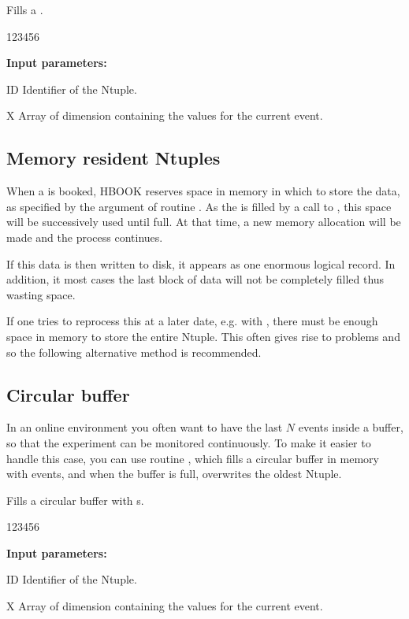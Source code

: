  
\Action
Fills a \RWN{}.
 
\begin{DLtt}{123456}
\item[{\rm\bf Input parameters:}]
\item[ID] Identifier of the Ntuple.
\item[X] Array of dimension  containing
the values for the current event.
\end{DLtt}
 
\subsection*{Memory resident Ntuples} 

When a \RWN{} is booked, HBOOK reserves space in memory
in which to store the data, as specified by the 
argument of routine .
As the \RWN{} is filled by a call to , 
this space will be successively used until full. 
At that time, a new memory allocation will be made
and the process continues.

If this data is then written to disk, it appears as one
enormous logical record. 
In addition, it most cases the last block of data will 
not be completely filled thus wasting space.

If one tries to reprocess this \RWN{} at a later date,
e.g. with \PAW{}, there must be enough space in memory to
store the entire Ntuple. 
This often gives rise to problems
and so the following alternative method is recommended.

\subsection*{Circular buffer}

In an online environment you often want to have the last $N$ events
inside a buffer, so that the experiment can be monitored continuously.
To make it easier to handle this case, you can use routine ,
which fills a circular buffer in memory with \RWN{} events, and when
the buffer is full, overwrites the oldest Ntuple.

 
\Action
Fills a circular buffer with \RWN{}s.
 
\begin{DLtt}{123456}
\item[{\rm\bf Input parameters:}]
\item[ID] Identifier of the Ntuple.
\item[X] Array of dimension  containing
the values for the current event.
\end{DLtt}

